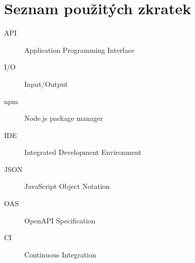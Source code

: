 \documentclass[thesis=B,czech]{FITthesis}[2012/06/26]
\begin{document}



\appendix

\chapter{Seznam použitých zkratek}
\begin{description}
	\item[API] Application Programming Interface
	\item[I/O] Input/Output
	\item[npm] Node.js package manager
	\item[IDE] Integrated Development Environment
	\item[JSON] JavaScript Object Notation
	\item[OAS] OpenAPI Specification
	\item[CI] Continuous Integration
\end{description}
\end{document}
